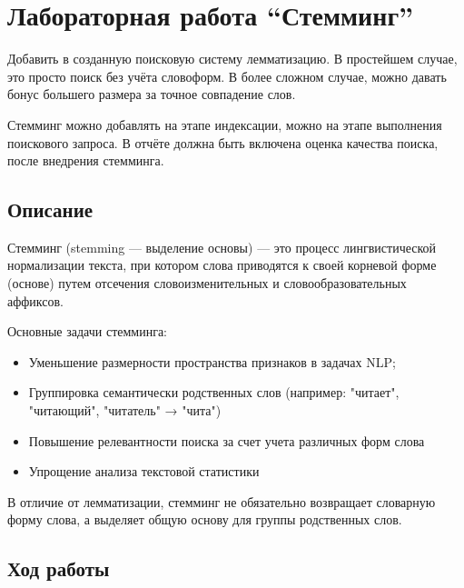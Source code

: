 \documentclass[pdf, unicode, 12pt, a4paper, oneside, fleqn]{article}
\begin{document}
\pagebreak

\section{Лабораторная работа  \enquote{Стемминг}}

Добавить в созданную поисковую систему лемматизацию. 
В простейшем случае, это просто поиск без учёта словоформ. В более 
сложном случае, можно давать бонус большего размера за точное 
совпадение слов. 

Стемминг можно добавлять на этапе индексации, можно на этапе 
выполнения поискового запроса. В отчёте должна быть включена оценка 
качества поиска, после внедрения стемминга. 


\subsection*{Описание}

Стемминг (stemming — выделение основы) — это процесс 
лингвистической нормализации текста, при котором слова приводятся к 
своей корневой форме (основе) путем отсечения словоизменительных и 
словообразовательных аффиксов. 

Основные задачи стемминга: 
\begin{itemize}
\item Уменьшение размерности пространства признаков в задачах NLP; 
\item Группировка семантически родственных слов (например: "читает", 
"читающий", "читатель" → "чита") 
\item Повышение релевантности поиска за счет учета различных форм слова 
\item Упрощение анализа текстовой статистики 
\end{itemize}
В отличие от лемматизации, стемминг не обязательно возвращает 
словарную форму слова, а выделяет общую основу для группы родственных 
слов. 


\subsection*{Ход работы}
\end{document}
